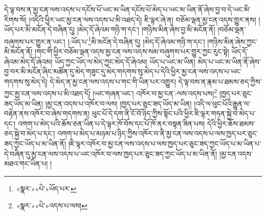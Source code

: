 དེ་ལྟ་བས་ན་མྱ་ངན་ལས་འདས་པ་དངོས་པོ་ཡང་མ་ཡིན་དངོས་པོ་མེད་པ་ཡང་མ་ཡིན་ནོ་ཞེས་བྱ་བ་དེ་ཡང་མི་རིགས་སོ། །འདིའི་ཕྱིར་ཡང་མྱ་ངན་ལས་འདས་པ་མི་འཐད་དེ། ཇི་ལྟར་ཞེ་ན། བཅོམ་ལྡན་མྱ་ངན་འདས་གྱུར་ནས། །ཡོད་པར་མི་མངོན་དེ་བཞིན་དུ། །མེད་དོ་ཞེའམ་གཉི་ག་དང་། །གཉིས་མིན་ཞེས་བྱ་མི་མངོན་ནོ། །བཅོམ་ལྡན་བཞུགས་པར་གྱུར་ན་ཡང་། །:ཡོད་པ་\footnote{«སྣར་»«པེ་»ཡོད་པར་}མི་མངོན་དེ་བཞིན་དུ། །མེད་དོ་ཞེའམ་གཉི་ག་དང་། །གཉིས་མིན་ཞེས་ཀྱང་མི་མངོན་ནོ། །གང་གི་ཕྱིར་བཅོམ་ལྡན་འདས་མྱ་ངན་ལས་འདས་སམ་བཞུགས་པར་གྱུར་ཀྱང་རུང་སྟེ། ཡོད་དོ་ཞེའམ་མེད་དོ་ཞེའམ། ཡོད་ཀྱང་ཡོད་ལ་མེད་ཀྱང་མེད་དོ་ཞེའམ། ཡོད་པ་ཡང་མ་ཡིན། མེད་པ་ཡང་མ་ཡིན་ནོ་ཞེས་བྱ་བར་མི་མངོན་ཞིང་མཚོན་དུ་མེད་གཟུང་དུ་མེད་གདགས་སུ་མེད་པ་དེའི་ཕྱིར་མྱ་ངན་ལས་འདས་པ་ཡང་གདགས་སུ་མེད་དེ། དེ་མེད་ན་མྱ་ངན་ལས་འདས་པ་གང་གི་ཡིན་པར་འགྱུར། དེ་ལྟ་བས་ན་རྣམ་པ་ཐམས་ཅད་ཀྱིས་ཀྱང་མྱ་ངན་ལས་འདས་པ་མི་འཐད་དོ། །ཡང་གཞན་ཡང་། འཁོར་བ་མྱ་ངན་:ལས་འདས་པས།\footnote{«སྣར་»«པེ་»འདས་པ་ལས།} །ཁྱད་པར་ཅུང་ཟད་ཡོད་མ་ཡིན། །མྱ་ངན་འདས་པ་འཁོར་བ་ལས། །ཁྱད་པར་ཅུང་ཟད་ཡོད་མ་ཡིན། །འདི་ལ་ཕུང་པོའི་རྒྱུན་ལ་བརྟེན་ནས་འཁོར་བ་ཞེས་གདགས་ན། ཕུང་པོ་དེ་དག་ནི་ངོ་བོ་ཉིད་ཀྱིས་སྟོང་པའི་ཕྱིར་ཇི་ལྟར་གཏན་སྐྱེ་བ་མེད་པ་དང་། འགག་པ་མེད་པའི་ཆོས་ཅན་ཡིན་པ་དེ་ལྟར་ཁོ་བོས་དང་པོ་ཁོ་ནར་བསྟན་ཟིན་པས། དེའི་ཕྱིར་ཆོས་ཐམས་ཅད་སྐྱེ་བ་མེད་པ་དང་། འགག་པ་མེད་པ་མཉམ་པ་ཉིད་ཀྱིས་འཁོར་བ་ནི་མྱ་ངན་ལས་འདས་པ་ལས་ཁྱད་པར་ཅུང་ཟད་ཀྱང་ཡོད་པ་མ་ཡིན་ནོ། །ཇི་ལྟར་འཁོར་བ་མྱ་ངན་ལས་འདས་པ་ལས་ཁྱད་པར་ཅུང་ཟད་ཀྱང་ཡོད་པ་མ་ཡིན་པ་དེ་བཞིན་དུ་མྱ་ངན་ལས་འདས་པ་ཡང་འཁོར་བ་ལས་ཁྱད་པར་ཅུང་ཟད་ཀྱང་ཡོད་པ་མ་ཡིན་ནོ། །མྱ་ངན་འདས་མཐའ་གང་ཡིན་པ། །
